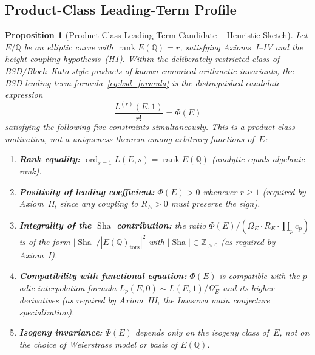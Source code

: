 \documentclass[aps,prd,twocolumn,superscriptaddress,nofootinbib,floatfix]{revtex4-2}
\newtheorem{proposition}[theorem]{Proposition}
\theoremstyle{definition}
\theoremstyle{remark}
\DeclareMathOperator{\ord}{ord}
\DeclareMathOperator{\rank}{rank}
\DeclareMathOperator{\Sha}{Sha}
\begin{document}
\subsection{Product-Class Leading-Term Profile}

\begin{proposition}[Product-Class Leading-Term Candidate -- Heuristic Sketch]
\label{thm:uniqueness}
Let $E/\mathbb{Q}$ be an elliptic curve with $\rank E(\mathbb{Q}) = r$, satisfying Axioms~I--IV and the height coupling hypothesis~(H1). Within the deliberately restricted class of BSD/Bloch--Kato-style products of known canonical arithmetic invariants, the BSD leading-term formula~\eqref{eq:bsd_formula} is the distinguished candidate expression
\[
  \frac{L^{(r)}(E,1)}{r!} = \Phi(E)
\]
satisfying the following five constraints simultaneously. This is a product-class motivation, not a uniqueness theorem among arbitrary functions of~$E$:
\begin{enumerate}
  \item[\textbf{(U1)}] \textbf{Rank equality:} $\ord_{s=1} L(E,s) = \rank E(\mathbb{Q})$ (analytic equals algebraic rank).
  \item[\textbf{(U2)}] \textbf{Positivity of leading coefficient:} $\Phi(E) > 0$ whenever $r \geq 1$ (required by Axiom~II, since any coupling to $R_E > 0$ must preserve the sign).
  \item[\textbf{(U3)}] \textbf{Integrality of the $\Sha$ contribution:} the ratio $\Phi(E)/(\Omega_E \cdot R_E \cdot \prod_p c_p)$ is of the form $|\Sha|/|E(\mathbb{Q})_{\mathrm{tors}}|^2$ with $|\Sha| \in \mathbb{Z}_{>0}$ (as required by Axiom~I).
  \item[\textbf{(U4)}] \textbf{Compatibility with functional equation:} $\Phi(E)$ is compatible with the $p$-adic interpolation formula $L_p(E,0) \sim L(E,1)/\Omega_E^+$ and its higher derivatives (as required by Axiom~III, the Iwasawa main conjecture specialization).
  \item[\textbf{(U5)}] \textbf{Isogeny invariance:} $\Phi(E)$ depends only on the isogeny class of~$E$, not on the choice of Weierstrass model or basis of $E(\mathbb{Q})$.
\end{enumerate}
\end{proposition}
\end{document}
